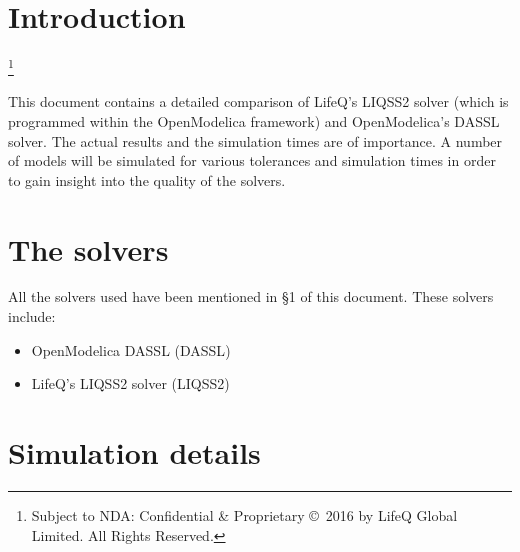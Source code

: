 \documentclass[10pt]{article}
\newcommand\blfootnote[1]{%
  \begingroup
  \renewcommand\thefootnote{}\footnote{#1}%
  \addtocounter{footnote}{-1}%
  \endgroup
}
\begin{document}
\newcommand{\bottomline}{\arrayrulecolor{white}\specialrule{\aboverulesep}{0pt}{0pt}%
	\arrayrulecolor{black}\specialrule{\heavyrulewidth}{0pt}{\belowbottomsep}}%

\newcommand{\bottomlinec}{\arrayrulecolor{tablerowcolor}\specialrule{\aboverulesep}{0pt}{0pt}%
	\arrayrulecolor{black}\specialrule{\heavyrulewidth}{0pt}{\belowbottomsep}}%

\newcommand{\bottomlinect}{\arrayrulecolor{tableheadcolor}\specialrule{\aboverulesep}{0pt}{0pt}%
	\arrayrulecolor{black}\specialrule{\heavyrulewidth}{0pt}{\belowbottomsep}}%



\maketitle



\pagestyle{myheadings}


\section{Introduction}

\blfootnote{Subject to NDA: Confidential \& Proprietary \copyright\ 2016 by LifeQ Global Limited. All Rights Reserved.}

This document contains a detailed comparison of LifeQ's LIQSS2 solver (which is programmed within the OpenModelica framework) and OpenModelica's DASSL solver. The actual results and the simulation times are of importance. A number of models will be simulated for various tolerances and simulation times in order to gain insight into the quality of the solvers.


\section{The solvers}

All the solvers used have been mentioned in \S1 of this document. These solvers include:
\begin{itemize}
 \item OpenModelica DASSL ({\sf DASSL})
 \item LifeQ's LIQSS2 solver ({\sf LIQSS2})
\end{itemize}

\section{Simulation details}
\end{document}
